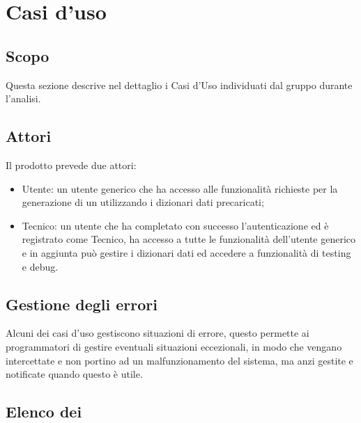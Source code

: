 \section{Casi d'uso}

\subsection{Scopo}
Questa sezione descrive nel dettaglio i Casi d’Uso individuati dal gruppo durante l'analisi.

\subsection{Attori}
Il prodotto prevede due attori:
\begin{itemize}
  \item Utente: un utente generico che ha accesso alle funzionalità richieste per la generazione di un  utilizzando i dizionari dati precaricati;
  \item Tecnico: un utente che ha completato con successo l'autenticazione ed è registrato come Tecnico, ha accesso a tutte le funzionalità dell'utente generico e in aggiunta può gestire i dizionari dati ed accedere a funzionalità di testing e debug.
\end{itemize}

\subsection{Gestione degli errori}
Alcuni dei casi d'uso gestiscono situazioni di errore, questo permette ai programmatori di gestire eventuali situazioni eccezionali, in modo che vengano intercettate e non portino ad un malfunzionamento del sistema, ma anzi gestite e notificate quando questo è utile.

\subsection{Elenco dei }

